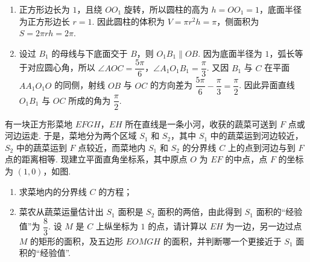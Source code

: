 \begin{solution}
\begin{enumerate}
\item 正方形边长为 \(1\)，且绕 \(OO_1\) 旋转，所以圆柱的高为 \(h=OO_1=1\)，底面半径为正方形边长 \(r=1\). 因此圆柱的体积为 \(V=\pi r^2h=\pi\)，侧面积为 \(S=2\pi rh=2\pi\).
\item 设过 \(B_1\) 的母线与下底面交于 \(B\)，则 \(O_1B_1\parallel OB\). 因为底面半径为 \(1\)，弧长等于对应圆心角，所以 \(\angle AOC=\dfrac{5\pi}{6}\)，\(\angle A_1O_1B_1=\dfrac\pi3\). 又因 \(B_1\) 与 \(C\) 在平面 \(AA_1O_1O\) 的同侧，射线 \(OB\) 与 \(OC\) 的方向差为 \(\dfrac{5\pi}{6}-\dfrac\pi3=\dfrac\pi2\). 因此异面直线 \(O_1B_1\) 与 \(OC\) 所成的角为 \(\dfrac\pi2\).
\end{enumerate}
\end{solution}

\begin{problem}
有一块正方形菜地 \(EFGH\)，\(EH\) 所在直线是一条小河，收获的蔬菜可送到 \(F\) 点或河边运走. 于是，菜地分为两个区域 \(S_1\) 和 \(S_2\)，其中 \(S_1\) 中的蔬菜运到河边较近，\(S_2\) 中的蔬菜运到 \(F\) 点较近，而菜地内 \(S_1\) 和 \(S_2\) 的分界线 \(C\) 上的点到河边与到 \(F\) 点的距离相等. 现建立平面直角坐标系，其中原点 \(O\) 为 \(EF\) 的中点，点 \(F\) 的坐标为 \((1,0)\)，如图.

\begin{enumerate}
\item 求菜地内的分界线 \(C\) 的方程；
\item 菜农从蔬菜运量估计出 \(S_1\) 面积是 \(S_2\) 面积的两倍，由此得到 \(S_1\) 面积的“经验值”为 \(\dfrac83\). 设 \(M\) 是 \(C\) 上纵坐标为 \(1\) 的点，请计算以 \(EH\) 为一边，另一边过点 \(M\) 的矩形的面积，及五边形 \(EOMGH\) 的面积，并判断哪一个更接近于 \(S_1\) 面积的“经验值”.
\end{enumerate}

\end{problem}

